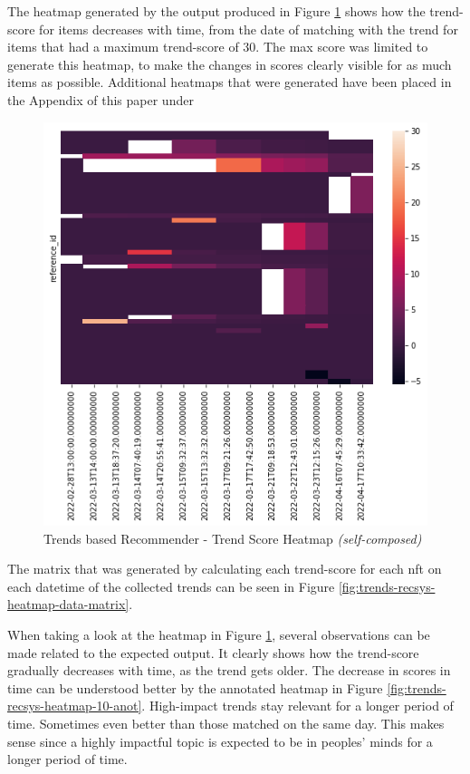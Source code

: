 \documentclass[manuscript,natbib=false]{acmart}
\begin{document}
The heatmap generated by the output produced in Figure \ref{fig:trends-recsys-heatmap30} shows how the trend-score for items decreases with time, from the date of matching with the trend for items that had a maximum trend-score of 30. The max score was limited to generate this heatmap, to make the changes in scores clearly visible for as much items as possible. Additional heatmaps that were generated have been placed in the Appendix of this paper under \textit{}

\begin{figure}[h]
\centering
\includegraphics[width=0.6\linewidth]{images/trends-heatmap-30.png}
\caption{Trends based Recommender - Trend Score Heatmap \textit{(self-composed)}}
\label{fig:trends-recsys-heatmap30}
\end{figure}

The matrix that was generated by calculating each trend-score for each \gls{nft} on each datetime of the collected trends can be seen in Figure \ref{fig:trends-recsys-heatmap-data-matrix}.

When taking a look at the heatmap in Figure \ref{fig:trends-recsys-heatmap30}, several observations can be made related to the expected output.
It clearly shows how the trend-score gradually decreases with time, as the trend gets older. The decrease in scores in time can be understood better by the annotated heatmap in Figure \ref{fig:trends-recsys-heatmap-10-anot}.
High-impact trends stay relevant for a longer period of time. Sometimes even better than those matched on the same day. This makes sense since a highly impactful topic is expected to be in peoples' minds for a longer period of time.
\end{document}
